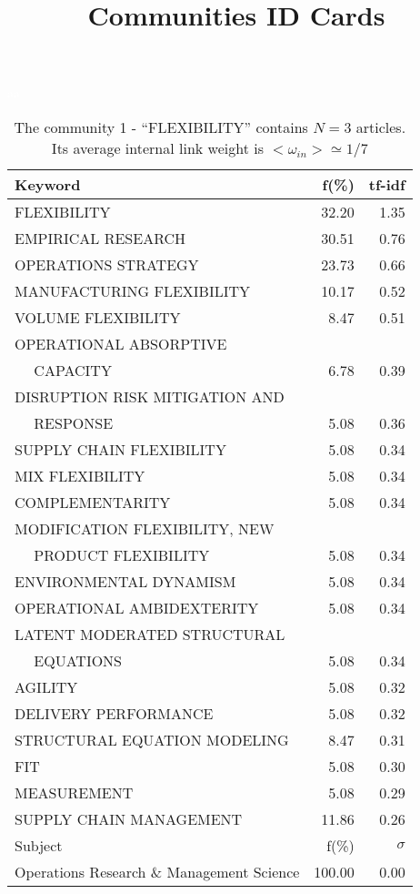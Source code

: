 \documentclass[a4paper,11pt]{report}
\title{{\bf Communities ID Cards}}
\date{\begin{flushleft}This document gather the ``ID Cards'' of the CC communities found within your database.\\
 The CC network was built by keeping a link between articles sharing at least 5 references. The communities characterized here correspond to the ones found in the level 0 (in the sense of the Louvain algo) which gathers more than 0 articles.\\
 These ID cards displays the most frequent keywords, subject categories, journals of publication, institution, countries, authors, references and reference journals of the articles of each community. The significance of an item $\sigma = \sqrt{N} (f - p) / \sqrt{p(1-p)}$ [where $N$ is the number of articles within the community and $f$ and $p$ are the proportion of articles respectively within the community and within the database displaying that item ] is also given (for example $\sigma > 5$ is really highly significant). The tf-idf value which can be calculated by $tf-idf = f*log(frac{1}{p})$ is also given.\\
\vspace{1cm}
\copyright Sebastian Grauwin, Liu Weizhi - (2014) \end{flushleft}}
\begin{document}
\begin{landscape}
\maketitle
\clearpage

\begin{table}[!ht]
\caption{The community 1 - ``FLEXIBILITY'' contains $N = 3$ articles. Its average internal link weight is $<\omega_{in}> \simeq 1/7$ }
\textcolor{white}{aa}\\
{\scriptsize\begin{tabular}{|l r  r|}
\hline
Keyword & f(\%) & tf-idf \\
\hline
FLEXIBILITY & 32.20 & 1.35\\
EMPIRICAL RESEARCH & 30.51 & 0.76\\
OPERATIONS STRATEGY & 23.73 & 0.66\\
MANUFACTURING FLEXIBILITY & 10.17 & 0.52\\
VOLUME FLEXIBILITY & 8.47 & 0.51\\
OPERATIONAL ABSORPTIVE &  &\\
$\quad$ CAPACITY & 6.78 & 0.39\\
DISRUPTION RISK MITIGATION AND &  &\\
$\quad$ RESPONSE & 5.08 & 0.36\\
SUPPLY CHAIN FLEXIBILITY & 5.08 & 0.34\\
MIX FLEXIBILITY & 5.08 & 0.34\\
COMPLEMENTARITY & 5.08 & 0.34\\
MODIFICATION FLEXIBILITY, NEW &  &\\
$\quad$ PRODUCT FLEXIBILITY & 5.08 & 0.34\\
ENVIRONMENTAL DYNAMISM & 5.08 & 0.34\\
OPERATIONAL AMBIDEXTERITY & 5.08 & 0.34\\
LATENT MODERATED STRUCTURAL &  &\\
$\quad$ EQUATIONS & 5.08 & 0.34\\
AGILITY & 5.08 & 0.32\\
DELIVERY PERFORMANCE & 5.08 & 0.32\\
STRUCTURAL EQUATION MODELING & 8.47 & 0.31\\
FIT & 5.08 & 0.30\\
MEASUREMENT & 5.08 & 0.29\\
SUPPLY CHAIN MANAGEMENT & 11.86 & 0.26\\
\hline
\hline
Subject & f(\%) & $\sigma$\\
\hline
Operations Research \& Management Science & 100.00 & 0.00\\

\end{tabular}}
\end{table}
\end{landscape}
\end{document}
